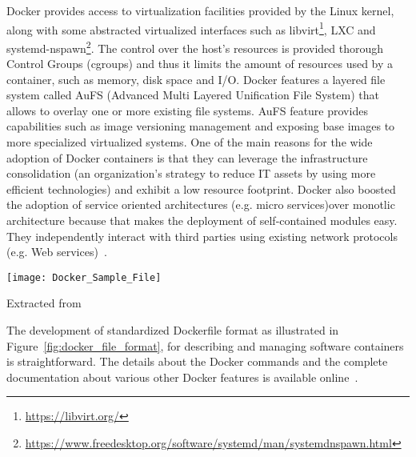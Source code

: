 Docker provides access to virtualization facilities provided by the 
Linux kernel, along with some abstracted virtualized interfaces such as 
libvirt\footnote{\url{https://libvirt.org/}}, LXC and 
systemd-nspawn\footnote{\url{https://www.freedesktop.org/software/systemd/man/systemdnspawn.html}}. 
The control over the host's resources is provided thorough Control 
Groups (cgroups) and thus it limits the amount of resources used by a 
container, such as memory, disk space and I/O. Docker features a layered 
file system called AuFS (Advanced Multi Layered Unification File 
System) that allows to overlay one or more existing file systems. AuFS 
feature provides capabilities such as image versioning management and 
exposing base images to more specialized virtualized systems. One of 
the main reasons for the wide adoption of Docker containers is that they 
can leverage the infrastructure consolidation (an organization's 
strategy to reduce IT assets by using more efficient technologies) and 
exhibit a low resource footprint. Docker also boosted the adoption 
of service oriented architectures (e.g. micro services)over monotlic architecture because that 
makes the deployment of self-contained modules easy. They independently interact with third parties using existing network 
protocols (e.g. Web services)~\cite{Xavier:2013:PEC:2497369.2497577}. 


\begin{center}
\texttt{[image: Docker\_Sample\_File]}
\label{fig:docker_file_format}
\caption*{Extracted from \cite{docker-file-format}}
\end{center}

The development of standardized Dockerfile format as illustrated in Figure~\ref{fig:docker_file_format}, for describing and managing 
software containers is straightforward. The details about the Docker commands and the complete 
documentation about various other Docker features is available online~\cite{docker_commands}.

